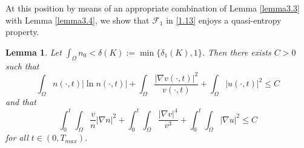 \documentclass[12pt]{article}
\theoremstyle{plain}
\newtheorem{lemma}{Lemma}[section]
\theoremstyle{definition}
\numberwithin{equation}{section}
\begin{document}
At this position by means of an appropriate combination of Lemma \ref{lemma3.3} with Lemma \ref{lemma3.4}, we
show that $\mathcal{F}_1$  in \eqref{1.13} enjoys a quasi-entropy property.

\begin{lemma}\label{lemma3.5} Let $\int_\Omega n_0<\delta(K):=\min\{\delta_1(K),1\}$. Then there exists $C>0$ such that
\begin{equation}\label{3.16}
\int_\Omega n(\cdot,t)|\ln n(\cdot,t)|+\int_\Omega  \frac{|\nabla v(\cdot,t)|^2}{v(\cdot,t)}+\int_\Omega |u(\cdot,t)|^2\leq C
\end{equation}
and that
\begin{equation}\label{3.17}
\int_0^t\int_\Omega\frac{v}{n}|\nabla n|^2+
\int_0^t \int_\Omega \frac{|\nabla v|^4}{v^3}
+\int^t_0\int_\Omega |\nabla u|^2
\leq C
\end{equation} for all $t\in (0,T_{max})$.
\end{lemma}
\end{document}

